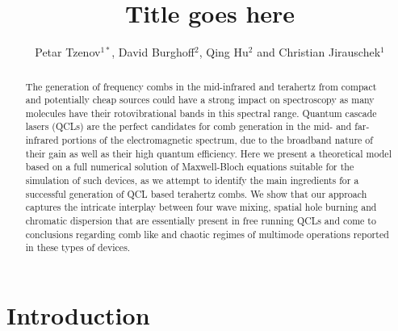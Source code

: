 \documentclass[twocolumn,secnumarabic,amssymb, nobibnotes, aps, prd]{revtex4-1}
\begin{document}
\title{Title goes here}

\author{Petar Tzenov$^{1*}$,  David Burghoff$^{2}$, Qing Hu$^{2}$ and Christian Jirauschek$^1$}

\address{$^1$ Institute for Nanoelectronics, Technical University f Munich, D-80333 Munich, Germany}
\address{$^2$ Department of Electrical Engineering and Computer Science, Research Laboratory of Electronics, Massachusetts Institute of Technology, Cambridge,
	Massachusetts 02139, USA}




\begin{abstract}
	The generation of frequency combs in the mid-infrared and terahertz from compact and potentially cheap sources could have a strong impact on spectroscopy as many molecules have their rotovibrational bands in this spectral range. Quantum cascade lasers (QCLs) are the perfect candidates for comb generation in the mid- and far-infrared portions of the electromagnetic spectrum, due to the broadband nature of their gain as well as their high quantum efficiency. Here we present a theoretical model based on a full numerical solution of  Maxwell-Bloch equations suitable for the simulation of such devices, as we attempt to identify the main ingredients for a successful generation of QCL based terahertz combs. We show that our approach captures the intricate interplay between four wave mixing, spatial hole burning and chromatic dispersion that are essentially present in free running QCLs and come to conclusions regarding comb like and chaotic regimes of multimode operations reported in these types of devices. 
\end{abstract}

\tableofcontents


\section{Introduction}
\label{sec:intro}
\end{document}
